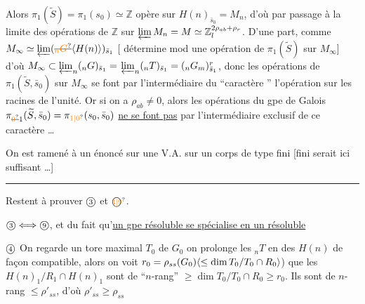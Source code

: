 Alors $\pi_1(\widetilde S)=\pi_1(s_0)\simeq\mathbb Z$ opère sur $H(n)_{\bar s_0}=M_n$, d'où par passage à la limite des opérations de $\mathbb Z$ sur $\varprojlim M_n=M\simeq\mathbb Z_l^{2\rho_{ab}+\rho_r}$. D'une part,  comme $M_\infty\simeq\varprojlim(\deleted{\unsure{{}_nG}}\inserted{H(n)})_{\bar s_1}$  [ détermine mod une opération de $\pi_1(\widetilde S)$ sur $M_\infty$] d'où $M_\infty\subset\varprojlim_n({}_nG)_{\bar s_1}=$ 
$\varprojlim_n({}_nT)_{\bar s_1}=({}_nG_m)^r_{\bar s_1}$, donc les opérations de $\pi_1(\widetilde S,\bar s_0)$ sur $M_\infty$ se font par l'intermédiaire du ``caractère '' l'opération sur les racines de l'unité. Or si on a $\rho_{ab}\neq 0$, alors les opérations du gpe de Galois $\pi_{\deleted{\unsure{0}}1}(\widetilde S,\bar s_0)=\pi_{\unsure{1|0}}(s_0,\bar s_0)$ \uline{ne se font pas} par l'intermédiaire exclusif de ce caractère \ldots

On est ramené à un énoncé sur une V.A. sur un corps  de type fini [fini serait ici suffisant \ldots]

\begin{center}\rule{2.5cm}{0.35pt}\end{center}

Restent à prouver $\text{\textcircled{\scriptsize 3}}$ et $\text{\textcircled{\scriptsize\unsure{4|9}}}$.

$\text{\textcircled{\scriptsize 3}}\Longleftrightarrow\text{\textcircled{\scriptsize 9}}$, et   du fait qu'\uline{un gpe résoluble se spécialise en un résoluble}

$\text{\textcircled{\scriptsize 4}}$ On regarde un tore maximal $T_0$ de $G_0$
on prolonge les $ {}_nT$ en des $H(n)$ de façon compatible, alors on voit  $r_0=\rho_{ss}(G_0)\inserted{\leq\dim T_0/T_0\cap R_0}$) que les $H(n)_1/R_1\cap H(n)_1$ sont de ``$n$-rang'' $\geq\dim T_0/T_0\cap R_0\geq r_0$. Ils sont de $n$-rang $\leq\rho'_{ss}$, d'où $\rho'_{ss}\geq\rho_{ss}$ \unsure{\textendash|\ldots}
